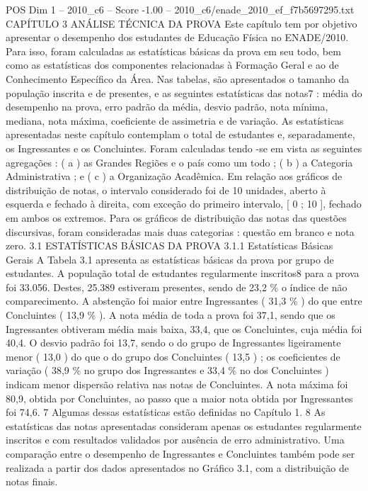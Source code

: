 \begin{textsample}{POS Dim 1 – 2010\_c6 – Score -1.00 – 2010\_c6/enade\_2010\_ef\_f7b5697295.txt}  \label{ex:f1_pos_166}
CAPÍTULO 3 ANÁLISE TÉCNICA DA PROVA Este capítulo tem por objetivo apresentar o desempenho dos estudantes de Educação Física no ENADE/2010.
Para isso, foram calculadas as estatísticas básicas da prova em seu todo, bem como as estatísticas dos componentes relacionadas à Formação Geral e ao de Conhecimento Específico da Área.
Nas tabelas, são apresentados o tamanho da população inscrita e de presentes, e as seguintes estatísticas das notas7 : média do desempenho na prova, erro padrão da média, desvio padrão, nota mínima, mediana, nota máxima, coeficiente de assimetria e de variação.
As estatísticas apresentadas neste capítulo contemplam o total de estudantes e, separadamente, os Ingressantes e os Concluintes.
Foram calculadas tendo -se em vista as seguintes agregações : ( a ) as Grandes Regiões e o país como um todo ; ( b ) a Categoria Administrativa ; e ( c ) a Organização Acadêmica.
Em relação aos gráficos de distribuição de notas, o intervalo considerado foi de 10 unidades, aberto à esquerda e fechado à direita, com exceção do primeiro intervalo, [ 0 ; 10 ], fechado em ambos os extremos.
Para os gráficos de distribuição das notas das questões discursivas, foram consideradas mais duas categorias : questão em branco e nota zero. 3.1 ESTATÍSTICAS BÁSICAS DA PROVA 3.1.1 Estatísticas Básicas Gerais A Tabela 3.1 apresenta as estatísticas básicas da prova por grupo de estudantes.
A população total de estudantes regularmente inscritos8 para a prova foi 33.056.
Destes, 25.389 estiveram presentes, sendo de 23,2 \% o índice de não comparecimento.
A abstenção foi maior entre Ingressantes ( 31,3 \% ) do que entre Concluintes ( 13,9 \% ).
A nota média de toda a prova foi 37,1, sendo que os Ingressantes obtiveram média mais baixa, 33,4, que os Concluintes, cuja média foi 40,4.
O desvio padrão foi 13,7, sendo o do grupo de Ingressantes ligeiramente menor ( 13,0 ) do que o do grupo dos Concluintes ( 13,5 ) ; os coeficientes de variação ( 38,9 \% no grupo dos Ingressantes e 33,4 \% no dos Concluintes ) indicam menor dispersão relativa nas notas de Concluintes.
A nota máxima foi 80,9, obtida por Concluintes, ao passo que a maior nota obtida por Ingressantes foi 74,6. 7 Algumas dessas estatísticas estão definidas no Capítulo 1. 8 As estatísticas das notas apresentadas consideram apenas os estudantes regularmente inscritos e com resultados validados por ausência de erro administrativo.
Uma comparação entre o desempenho de Ingressantes e Concluintes também pode ser realizada a partir dos dados apresentados no Gráfico 3.1, com a distribuição de notas finais.

\end{textsample}
